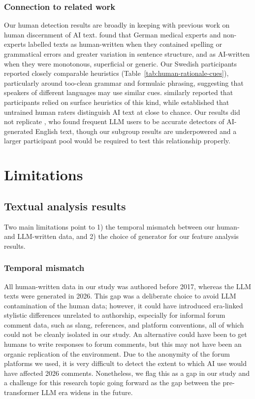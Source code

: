 \documentclass[thesis]{cluu}
\begin{document}
\subsection{Connection to related work}
Our human detection results are broadly in keeping with previous work on human discernment of AI text. \textcite{doruetal} found that German medical experts and non-experts labelled texts as human-written when they contained spelling or grammatical errors and greater variation in sentence structure, and as AI-written when they were monotonous, superficial or generic. Our Swedish participants reported closely comparable heuristics (Table~\ref{tab:human-rationale-cues}), particularly around too-clean grammar and formulaic phrasing, suggesting that speakers of different languages may use similar cues. \textcite{dugan2024detecting} similarly reported that participants relied on surface heuristics of this kind, while \textcite{clark2021all} established that untrained human raters distinguish AI text at close to chance. Our results did not replicate \textcite{russell2025people}, who found frequent LLM users to be accurate detectors of AI-generated English text, though our subgroup results are underpowered and a larger participant pool would be required to test this relationship properly.

\chapter{Limitations}

\section{Textual analysis results}
Two main limitations point to 1) the temporal mismatch between our human- and LLM-written data, and 2) the choice of generator for our feature analysis results.

\subsection{Temporal mismatch}
All human-written data in our study was authored before 2017, whereas the LLM texts were generated in 2026. This gap was a deliberate choice to avoid LLM contamination of the human data; however, it could have introduced era-linked stylistic differences unrelated to authorship, especially for informal forum comment data, such as slang, references, and platform conventions, all of which could not be cleanly isolated in our study. An alternative could have been to get humans to write responses to forum comments, but this may not have been an organic replication of the environment. Due to the anonymity of the forum platforms we used, it is very difficult to detect the extent to which AI use would have affected 2026 comments. Nonetheless, we flag this as a gap in our study and a challenge for this research topic going forward as the gap between the pre-transformer LLM era widens in the future.
\end{document}
